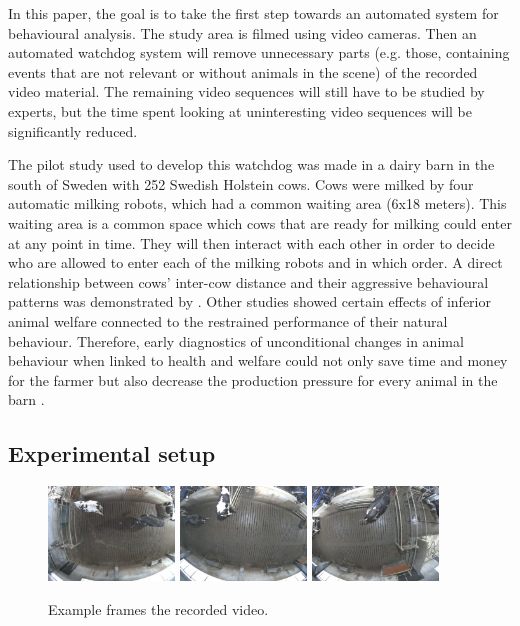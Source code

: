 \documentclass{IET}
\begin{document}
In this paper, the goal is to take the first step towards an automated system for behavioural analysis. The study area is filmed using video cameras. Then an automated watchdog system will remove unnecessary parts (e.g. those, containing events that are not relevant or without animals in the scene) of the recorded video material. The remaining video sequences will still have to be studied by experts, but the time spent looking at uninteresting video sequences will be significantly reduced.

The pilot study used to develop this watchdog was made in a dairy barn in the south of Sweden with 252 Swedish Holstein cows. Cows were milked by four automatic milking robots, which had a common waiting area (6x18 meters). This waiting area is a common space which cows that are ready for milking could enter at any point in time. They will then interact with each other in order to decide who are allowed to enter each of the milking robots and in which order. A direct relationship between cows' inter-cow distance and their aggressive behavioural patterns was demonstrated by \cite{DeVriesetal2004}. Other studies \cite{Hemsworth2003, Kilgour2012} showed certain effects of inferior animal welfare connected to the restrained performance of their natural behaviour. Therefore, early diagnostics of unconditional changes in animal behaviour when linked to health and welfare could not only save time and money for the farmer but also decrease the production pressure for every animal in the barn \cite{Polikarpusetal2015}.


\subsection{Experimental setup}

\begin{figure}[tb]
\begin{center}
  \includegraphics[width=0.3\textwidth]{old-2.jpg}
  \includegraphics[width=0.3\textwidth]{old-1.jpg}
  \includegraphics[width=0.3\textwidth]{old-0.jpg}
\end{center}
  \caption{Example frames the recorded video.}
  \label{fig:old}
\end{figure}
\end{document}
